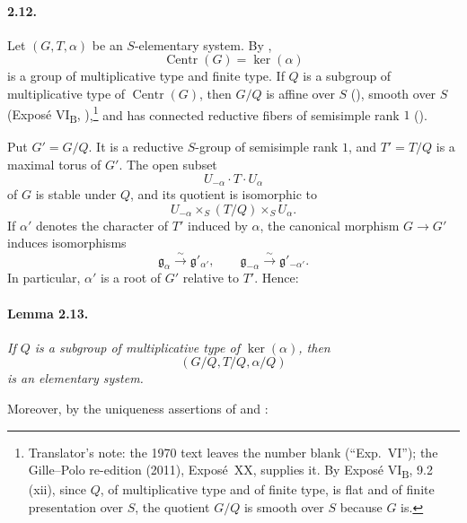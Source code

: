 \paragraph{\textbf{2.12.}}
Let \((G,T,\alpha)\) be an \(S\)-elementary system. By ,
\[
  \operatorname{Centr}(G)=\ker(\alpha)
\]
is a group of multiplicative type and finite type. If \(Q\) is a
subgroup of multiplicative type of \(\operatorname{Centr}(G)\),
then \(G/Q\) is affine over \(S\) \textup{()}, smooth
over \(S\) \textup{(Exposé VI\textsubscript{B}, )},\footnote{Translator's
note: the 1970 text leaves the number blank (``Exp.~VI\quad''); the Gille--Polo re-edition (2011),
Exposé~XX, supplies it. By Exposé VI\textsubscript{B}, 9.2\,(xii), since \(Q\), of multiplicative
type and of finite type, is flat and of finite presentation over \(S\), the quotient \(G/Q\) is
smooth over \(S\) because \(G\) is.} and has
connected reductive fibers of semisimple rank \(1\)
\textup{()}.

Put \(G'=G/Q\). It is a reductive \(S\)-group of semisimple rank
\(1\), and \(T'=T/Q\) is a maximal torus of \(G'\). The open
subset
\[
  U_{-\alpha}\cdot T\cdot U_\alpha
\]
of \(G\) is stable under \(Q\), and its quotient is isomorphic to
\[
  U_{-\alpha}\times_S(T/Q)\times_S U_\alpha.
\]
If \(\alpha'\) denotes the character of \(T'\) induced by
\(\alpha\), the canonical morphism \(G\to G'\) induces
isomorphisms
\[
  \mathfrak g_\alpha\xrightarrow{\sim}\mathfrak g'_{\alpha'},
  \qquad
  \mathfrak g_{-\alpha}\xrightarrow{\sim}\mathfrak g'_{-\alpha'}.
\]
In particular, \(\alpha'\) is a root of \(G'\) relative to \(T'\).
Hence:

\paragraph{\textbf{Lemma 2.13.}}
\emph{If \(Q\) is a subgroup of multiplicative type of
\(\ker(\alpha)\), then}
\[
  (G/Q,T/Q,\alpha/Q)
\]
\emph{is an elementary system.}

Moreover, by the uniqueness assertions of  and :
